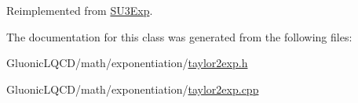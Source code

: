 Reimplemented from \mbox{\hyperlink{class_s_u3_exp_a9760c17b9c3a4b6d0a5cd4d88c6d577e}{S\+U3\+Exp}}.



The documentation for this class was generated from the following files\+:\begin{DoxyCompactItemize}
\item 
Gluonic\+L\+Q\+C\+D/math/exponentiation/\mbox{\hyperlink{taylor2exp_8h}{taylor2exp.\+h}}\item 
Gluonic\+L\+Q\+C\+D/math/exponentiation/\mbox{\hyperlink{taylor2exp_8cpp}{taylor2exp.\+cpp}}\end{DoxyCompactItemize}
